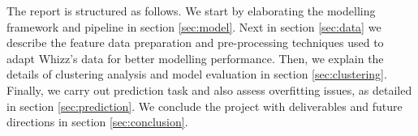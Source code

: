 The report is structured as follows. We start by elaborating the modelling framework and pipeline in section \ref{sec:model}. Next in section \ref{sec:data} we describe the feature data preparation and pre-processing techniques used to adapt Whizz's data for better modelling performance. Then, we explain the details of clustering analysis and model evaluation in section \ref{sec:clustering}. Finally, we carry out prediction task and also assess overfitting issues, as detailed in section \ref{sec:prediction}. We conclude the project with deliverables and future directions in section \ref{sec:conclusion}.
